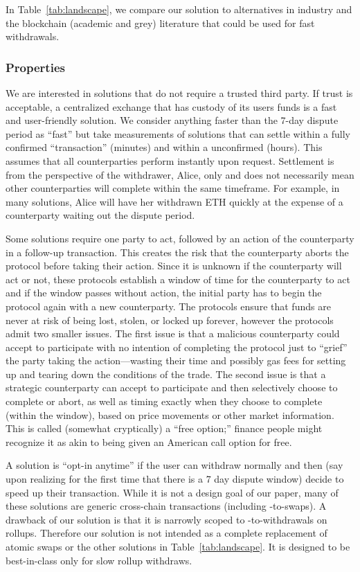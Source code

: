 In Table~\ref{tab:landscape}, we compare our solution to alternatives in industry and the blockchain (academic and grey) literature that could be used for fast withdrawals.

\subsubsection{Properties} 

We are interested in solutions that do not require a trusted third party. If trust is acceptable, a centralized exchange that has custody of its users funds is a fast and user-friendly solution. We consider anything faster than the 7-day dispute period as ``fast'' but take measurements of solutions that can settle within a fully confirmed ``\layerone transaction'' (\eg minutes) and within a unconfirmed \layertwo \rblock (\eg hours). This assumes that all counterparties perform instantly upon request. Settlement is from the perspective of the withdrawer, Alice, only and does not necessarily mean other counterparties will complete within the same timeframe. For example, in many solutions, Alice will have her withdrawn ETH quickly at the expense of a counterparty waiting out the dispute period.

Some solutions require one party to act, followed by an action of the counterparty in a follow-up transaction. This creates the risk that the counterparty aborts the protocol before taking their action. Since it is unknown if the counterparty will act or not, these protocols establish a window of time for the counterparty to act and if the window passes without action, the initial party has to begin the protocol again with a new counterparty. The protocols ensure that funds are never at risk of being lost, stolen, or locked up forever, however the protocols admit two smaller issues. The first issue is that a malicious counterparty could accept to participate with no intention of completing the protocol just to ``grief'' the party taking the action---wasting their time and possibly gas fees for setting up and tearing down the conditions of the trade. The second issue is that a strategic counterparty can accept to participate and then selectively choose to complete or abort, as well as timing exactly when they choose to complete (within the window), based on price movements or other market information. This is called (somewhat cryptically) a ``free option;'' finance people might recognize it as akin to being given an American call option for free. 

A solution is ``opt-in anytime'' if the user can withdraw normally and then (say upon realizing for the first time that there is a 7 day dispute window) decide to speed up their transaction. While it is not a design goal of our paper, many of these solutions are generic cross-chain transactions (including \layertwo-to-\layertwo swaps). A drawback of our solution is that it is narrowly scoped to \layertwo-to-\layerone withdrawals on rollups. Therefore our solution is not intended as a complete replacement of atomic swaps or the other solutions in Table~\ref{tab:landscape}. It is designed to be best-in-class only for slow rollup withdraws. 

